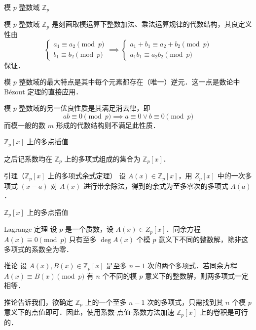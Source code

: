 \documentclass[fontset=fandol]{ctexbeamer}
\begin{document}
\begin{frame}{模 $p$ 整数域 $\mathbb Z_p$}

模 $p$ 整数域 $\mathbb Z_p$ 是刻画取模运算下整数加法、乘法运算规律的代数结构，其良定义性由
\[
\begin{cases}
    a_1 \equiv a_2 \pmod{p} \\
    b_1 \equiv b_2 \pmod{p}
\end{cases}
  \implies 
\begin{cases}
    a_1 + b_1 \equiv a_2 + b_2 \pmod{p} \\
    a_1 b_1 \equiv a_2 b_2 \pmod{p}
\end{cases}
\]
保证．

模 $p$ 整数域的最大特点是其中每个元素都存在（唯一）逆元．这一点是数论中 B{\'e}zout 定理的直接应用．

模 $p$ 整数域的另一优良性质是其满足消去律，即
\[
ab \equiv 0 \pmod p \implies a \equiv 0 \lor b \equiv 0 \pmod p
\]
而模一般的数 $m$ 形成的代数结构则不满足此性质．
\end{frame}

\begin{frame}{$\mathbb Z_p[x]$ 上的多点插值}

之后记系数均在 $\mathbb Z_p$ 上的多项式组成的集合为 $\mathbb Z_p[x]$．

\begin{block}{引理（$\mathbb Z_p[x]$ 上的多项式余式定理）}
    设 $A(x) \in \mathbb Z_p[x]$，用 $Z_p[x]$ 中的一次多项式 $(x-a)$ 对 $A(x)$ 进行带余除法，得到的余式为至多零次的多项式 $A(a)$．
\end{block}

\end{frame}

\begin{frame}{$\mathbb Z_p[x]$ 上的多点插值}

\begin{block}{Lagrange 定理}
    设 $p$ 是一个质数，设 $A(x) \in Z_p[x]$．同余方程 $A(x) \equiv 0 \pmod{p}$ 只有至多 $\deg A(x)$ 个模 $p$ 意义下不同的整数解，除非这多项式的系数全为零．
\end{block}

\begin{exampleblock}{推论}
    设 $A(x),B(x) \in \mathbb Z_p[x]$ 是至多 $n-1$ 次的两个多项式．若同余方程 $A(x) \equiv B(x) \pmod{p}$ 有 $n$ 个不同的模 $p$ 意义下的整数解，则两多项式一定相等．
\end{exampleblock}

推论告诉我们，欲确定 $\mathbb Z_p$ 上的一个至多 $n-1$ 次的多项式，只需找到其 $n$ 个模 $p$ 意义下的点值即可．因此，使用系数-点值-系数方法加速 $\mathbb Z_p[x]$ 上的卷积是可行的．

\end{frame}
\end{document}
